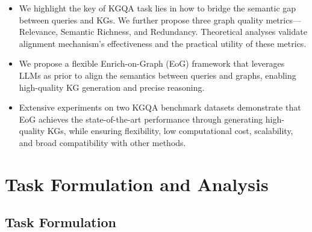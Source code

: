 \documentclass[11pt]{article}
\begin{document}
\begin{itemize}
\item We highlight the key of KGQA task lies in how to bridge the semantic gap between queries and KGs. We further propose three graph quality metrics—Relevance, Semantic Richness, and Redundancy. Theoretical analyses validate alignment mechanism's effectiveness and the practical utility of these metrics.

\item We propose a flexible Enrich-on-Graph (EoG) framework that leverages LLMs as prior to align the semantics between queries and graphs, enabling high-quality KG generation and precise reasoning.

\item Extensive experiments on two KGQA benchmark datasets demonstrate that EoG achieves the state-of-the-art performance through generating high-quality KGs, while ensuring flexibility, low computational cost, scalability, and broad compatibility with other methods.
\end{itemize}

\section{Task Formulation and Analysis}
\label{sec:methods}
\subsection{Task Formulation}
\end{document}
